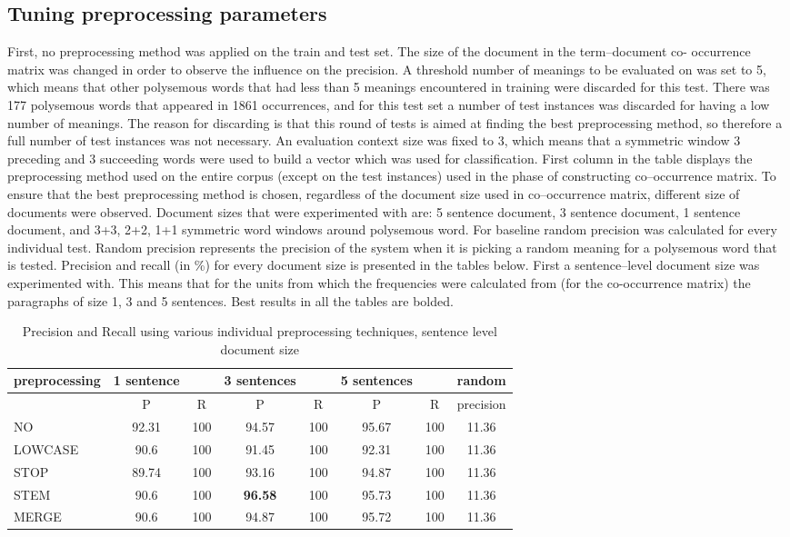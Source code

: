 \subsection{Tuning preprocessing parameters}
First, no preprocessing method was applied on the train and test set. The size of the document in the term--document co-
occurrence matrix was changed in order to observe the influence on the precision. A threshold number of meanings to be evaluated on was set to 5, which means that other polysemous words that had less than 5 meanings encountered in training were discarded for this test. There was 177 polysemous words that appeared in 1861 occurrences, and for this test set a number of test instances was discarded for having a 
low number of meanings. The reason for discarding is that this round of tests is aimed at finding the best preprocessing method, so therefore a full number of test instances was not necessary.  
 An evaluation context size was fixed to 3, which means that a symmetric window 3 preceding and 3 succeeding words were used to build a vector which was used for classification. First column in the table displays the preprocessing method used on the entire corpus (except on the test instances) used in the phase of constructing co--occurrence matrix. To ensure that the best preprocessing method is chosen, regardless of the 
document size used in co--occurrence matrix, different size of documents were observed. Document sizes that were
experimented with are: 5 sentence document, 3 sentence document, 1 sentence document, and 3+3, 2+2, 1+1 symmetric word windows around polysemous word.  
For baseline random precision was calculated for every individual test. Random precision represents the precision of the system when it is picking a random meaning for a polysemous word that is tested. 
Precision and recall (in \%) for every document size is presented in the tables below. First a sentence--level 
document size was experimented with. This means that for the units from which the frequencies were calculated from (for the co-occurrence matrix) the paragraphs of size 1, 3 and 5 sentences. 
Best results in all the tables are bolded. 

\begin{table}[h!]
\begin{tabular}{ l | c c | c c | c c | c}
   preprocessing &  1 sentence && 3 sentences && 5 sentences  && random\\
\hline
	& P  &  R & P  &  R & P  &  R & precision\\
\hline\hline
 NO  & 92.31 & 100 & 94.57 & 100 & 95.67 & 100  &11.36 \\
LOWCASE  & 90.6 & 100 & 91.45 & 100 & 92.31 & 100 & 11.36 \\
STOP  & 89.74 & 100 & 93.16 & 100 & 94.87 & 100 & 11.36 \\
 STEM  & 90.6 & 100 & \textbf{96.58} & 100 & 95.73 & 100 & 11.36 \\
 MERGE  & 90.6 & 100 & 94.87 & 100 & 95.72 & 100 & 11.36 \\
\end{tabular}
\caption{Precision and Recall using various individual preprocessing techniques, sentence level document size}
\end{table}

